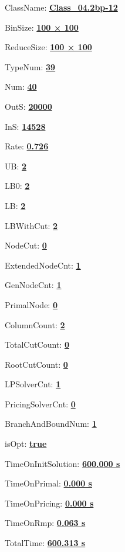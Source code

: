 \documentclass[11pt]{article}
\begin{document}
\pagestyle{empty}


ClassName: \underline{\textbf{Class_04.2bp-12}}
\par
BinSize: \underline{\textbf{100 × 100}}
\par
ReduceSize: \underline{\textbf{100 × 100}}
\par
TypeNum: \underline{\textbf{39}}
\par
Num: \underline{\textbf{40}}
\par
OutS: \underline{\textbf{20000}}
\par
InS: \underline{\textbf{14528}}
\par
Rate: \underline{\textbf{0.726}}
\par
UB: \underline{\textbf{2}}
\par
LB0: \underline{\textbf{2}}
\par
LB: \underline{\textbf{2}}
\par
LBWithCut: \underline{\textbf{2}}
\par
NodeCut: \underline{\textbf{0}}
\par
ExtendedNodeCnt: \underline{\textbf{1}}
\par
GenNodeCnt: \underline{\textbf{1}}
\par
PrimalNode: \underline{\textbf{0}}
\par
ColumnCount: \underline{\textbf{2}}
\par
TotalCutCount: \underline{\textbf{0}}
\par
RootCutCount: \underline{\textbf{0}}
\par
LPSolverCnt: \underline{\textbf{1}}
\par
PricingSolverCnt: \underline{\textbf{0}}
\par
BranchAndBoundNum: \underline{\textbf{1}}
\par
isOpt: \underline{\textbf{true}}
\par
TimeOnInitSolution: \underline{\textbf{600.000 s}}
\par
TimeOnPrimal: \underline{\textbf{0.000 s}}
\par
TimeOnPricing: \underline{\textbf{0.000 s}}
\par
TimeOnRmp: \underline{\textbf{0.063 s}}
\par
TotalTime: \underline{\textbf{600.313 s}}
\par
\newpage
\end{document}
